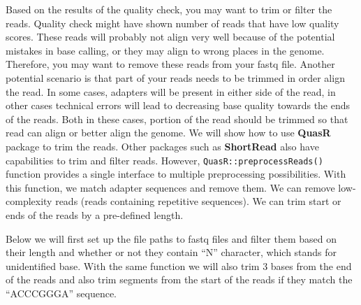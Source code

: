 \documentclass[12pt,]{krantz}
\begin{document}
Based on the results of the quality check, you may want to trim or filter the reads. Quality check might have shown number of reads that have low quality scores. These reads will probably not align very well because of the potential mistakes in base calling, or they may align to wrong places in the genome. Therefore, you may want to remove these reads from your fastq file. Another potential scenario is that part of your reads needs to be trimmed in order align the read. In some cases, adapters will be present in either side of the read, in other cases technical errors will lead to decreasing base quality towards the ends of the reads. Both in these cases, portion of the read should be trimmed so that read can align or better align the genome. We will show how to use \textbf{QuasR} package to trim the reads. Other packages such as \textbf{ShortRead} also have capabilities to trim and filter reads. However, \texttt{QuasR::preprocessReads()} function provides a single interface to multiple preprocessing possibilities. With this function, we match adapter sequences and remove them. We can remove low-complexity reads (reads containing repetitive sequences). We can trim start or ends of the reads by a pre-defined length.

Below we will first set up the file paths to fastq files and filter them based on their length and whether or not they contain ``N'' character, which stands for unidentified base. With the same function we will also trim 3 bases from the end of the reads and also trim segments from the start of the reads if they match the ``ACCCGGGA'' sequence.
\end{document}
